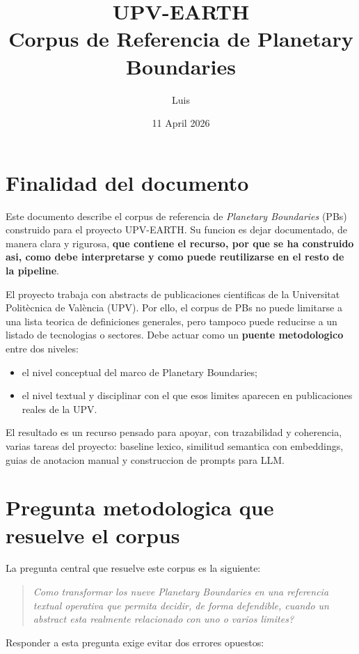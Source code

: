 \documentclass[11pt,a4paper]{article}
\title{UPV-EARTH\\Corpus de Referencia de Planetary Boundaries}
\author{Luis}
\date{11 April 2026}
\begin{document}
\maketitle

\section{Finalidad del documento}

Este documento describe el corpus de referencia de \textit{Planetary Boundaries} (PBs) construido para el proyecto UPV-EARTH. Su funcion es dejar documentado, de manera clara y rigurosa, \textbf{que contiene el recurso, por que se ha construido asi, como debe interpretarse y como puede reutilizarse en el resto de la pipeline}.

El proyecto trabaja con abstracts de publicaciones cientificas de la Universitat Polit\`ecnica de Val\`encia (UPV). Por ello, el corpus de PBs no puede limitarse a una lista teorica de definiciones generales, pero tampoco puede reducirse a un listado de tecnologias o sectores. Debe actuar como un \textbf{puente metodologico} entre dos niveles:

\begin{itemize}
\item el nivel conceptual del marco de Planetary Boundaries;
\item el nivel textual y disciplinar con el que esos limites aparecen en publicaciones reales de la UPV.
\end{itemize}

El resultado es un recurso pensado para apoyar, con trazabilidad y coherencia, varias tareas del proyecto: baseline lexico, similitud semantica con embeddings, guias de anotacion manual y construccion de prompts para LLM.

\section{Pregunta metodologica que resuelve el corpus}

La pregunta central que resuelve este corpus es la siguiente:

\begin{quote}
\textit{Como transformar los nueve Planetary Boundaries en una referencia textual operativa que permita decidir, de forma defendible, cuando un abstract esta realmente relacionado con uno o varios limites?}
\end{quote}

Responder a esta pregunta exige evitar dos errores opuestos:
\end{document}
